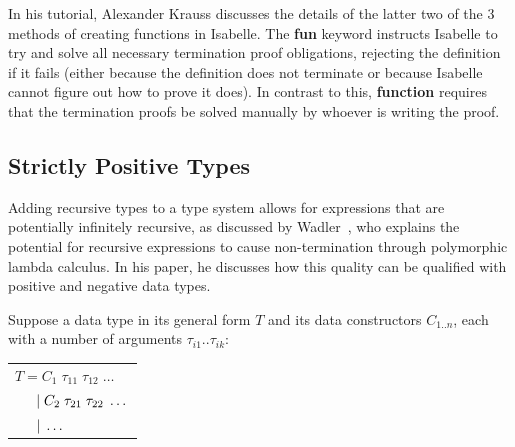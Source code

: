 In his tutorial\citep{KraussIsabelle}, Alexander Krauss discusses the details of the latter two of the 3 methods
of creating functions in Isabelle. The \textbf{fun} keyword instructs Isabelle to try and solve all necessary
termination proof obligations, rejecting the definition if it fails (either because the definition does not 
terminate or because Isabelle cannot figure out how to prove it does). In contrast to this, \textbf{function}
requires that the termination proofs be solved manually by whoever is writing the proof.



\subsection{Strictly Positive Types}

Adding recursive types to a type system allows for expressions that are potentially infinitely recursive,
as discussed by Wadler~\cite{RecursiveTypesForFree}, who explains the potential for recursive expressions
to cause non-termination through polymorphic lambda calculus. In his paper, he discusses how this
quality can be qualified with positive and negative data types.

Suppose a data type in its general form $T$ and its data constructors $C_{1..n}$, each with a number of arguments 
$\tau_{i1}..\tau_{ik}$:

\begin{center}
    \begin{tabular}{l}
        $T = C_1\; \tau_{11} \; \tau_{12} \; \dots$ \\
        $\hspace{1.5em} \vert\; C_2\; \tau_{21} \; \tau_{22} \; \dots$ \\
        $\hspace{1.5em} \vert\; \dots$ \\
    \end{tabular} 
\end{center}

